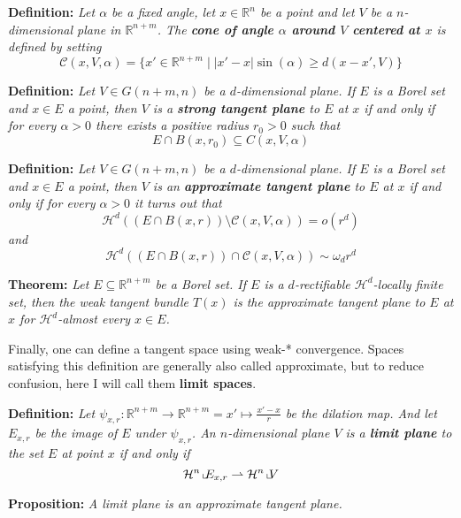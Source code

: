 \documentclass{article}
\begin{document}
\textbf{Definition:} \textit{Let $\alpha$ be a fixed angle, let $x\in\mathbb R^n$
be a point and let $V$ be a $n$-dimensional plane in $\mathbb R^{n+m}$. The \textbf{
cone of angle $\alpha$ around $V$ centered at $x$} is defined by setting
\[\mathcal C(x,V,\alpha)=\{x'\in\mathbb R^{n+m}\;|\; |x′−x|\sin(\alpha)\geq d(x−x′, V)\}\]
}

\vspace{2ex}
\textbf{Definition:} \textit{Let $V\in G(n+m, n)$ be a $d$-dimensional plane.
If $E$ is a Borel set and $x\in E$ a point, then $V$ is a \textbf{strong tangent plane}
to $E$ at $x$ if and only if for every $\alpha >0$ there exists a positive
radius $r_0 >0$ such that
\[E∩B(x, r_0)\subseteq C(x, V, \alpha)\]
}

\vspace{2ex}
\textbf{Definition:} \textit{Let $V\in G(n+m, n)$ be a $d$-dimensional plane.
If $E$ is a Borel set and $x\in E$ a point, then $V$ is an \textbf{approximate tangent
plane} to $E$ at $x$ if and only if for every $\alpha>0$ it turns out that
\[\mathcal H^d((E∩B(x,r))\setminus\mathcal C(x, V, \alpha)) = o(r^d)\]
and
\[\mathcal H^d((E∩B(x, r))∩\mathcal C(x, V, α))\sim \omega_dr^d\]
}

\textbf{Theorem:} \textit{Let $E\subseteq\mathbb R^{n+m}$ be a Borel set. If $E$
is a $d$-rectifiable $\mathcal H^d$-locally finite set, then the weak tangent
bundle $T(x)$ is the approximate tangent plane to $E$ at $x$ for $\mathcal H^d$-almost
every $x\in E$.}

\vspace{2ex}
Finally, one can define a tangent space using weak-* convergence. Spaces
satisfying this definition are generally also called approximate, but to reduce
confusion, here I will call them \textbf{limit spaces}.

\vspace{1ex}
\textbf{Definition:} \textit{Let $\psi_{x,r}:\mathbb R^{n+m}\rightarrow \mathbb
R^{n+m}=x'\mapsto \frac{x'-x}{r}$ be the dilation map. And let $E_{x,r}$ be the
image of $E$ under $\psi_{x,r}$. An $n$-dimensional plane $V$ is a
\textbf{limit plane} to the set $E$ at point $x$ if and only if
\[\mathcal H^n\,\llcorner\hspace{-1mm}E_{x,r}\rightharpoonup\mathcal H^n\,\llcorner\hspace{-1mm}V\]}

\vspace{2ex}
\textbf{Proposition:} \textit{A limit plane is an approximate tangent plane.}
\end{document}
